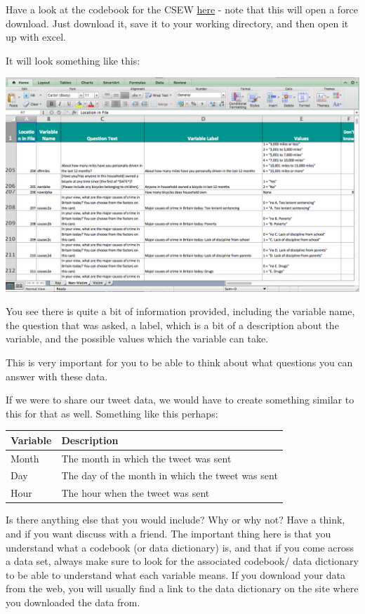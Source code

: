 \documentclass[]{book}
\theoremstyle{definition}
\theoremstyle{definition}
\theoremstyle{definition}
\theoremstyle{remark}
\begin{document}
Have a look at the codebook for the CSEW
\href{http://doc.ukdataservice.ac.uk/doc/7889/mrdoc/excel/7889_csew_data_dictionary_2002-03_to_2014-15.xlsx}{here}
- note that this will open a force download. Just download it, save it
to your working directory, and then open it up with excel.

It will look something like this:

\includegraphics{imgs/csew_dictionary.png}

You see there is quite a bit of information provided, including the
variable name, the question that was asked, a label, which is a bit of a
description about the variable, and the possible values which the
variable can take.

This is very important for you to be able to think about what questions
you can answer with these data.

If we were to share our tweet data, we would have to create something
similar to this for that as well. Something like this perhaps:

\begin{tabular}{l|l}
\hline
Variable & Description\\
\hline
Month & The month in which the tweet was sent\\
\hline
Day & The day of the month in which the tweet was sent\\
\hline
Hour & The hour when the tweet was sent\\
\hline
\end{tabular}

Is there anything else that you would include? Why or why not? Have a
think, and if you want discuss with a friend. The important thing here
is that you understand what a codebook (or data dictionary) is, and that
if you come across a data set, always make sure to look for the
associated codebook/ data dictionary to be able to understand what each
variable means. If you download your data from the web, you will usually
find a link to the data dictionary on the site where you downloaded the
data from.
\end{document}
